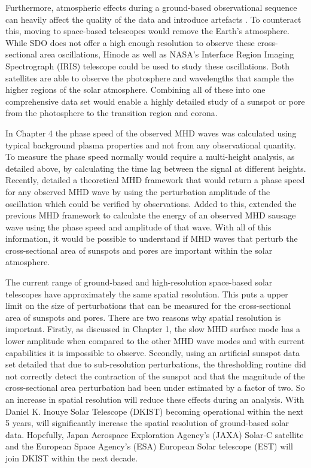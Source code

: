     Furthermore, atmospheric effects during a ground-based observational sequence can heavily affect the quality of the data and introduce artefacts \citep{2015A&A...579A..73M}.
    To counteract this, moving to space-based telescopes would remove the Earth's atmosphere.
    While SDO does not offer a high enough resolution to observe these cross-sectional area oscillations, Hinode as well as NASA's Interface Region Imaging Spectrograph (IRIS) telescope could be used to study these oscillations.
    Both satellites are able to observe the photosphere and wavelengths that sample the higher regions of the solar atmosphere. 
    Combining all of these into one comprehensive data set would enable a highly detailed study of a sunspot or pore from the photosphere to the transition region and corona.  
    
    In Chapter 4 the phase speed of the observed MHD waves was calculated using typical background plasma properties and not from any observational quantity.
    To measure the phase speed normally would require a multi-height analysis, as detailed above, by calculating the time lag between the signal at different heights.
    Recently, \cite{2015A&A...579A..73M} detailed a theoretical MHD framework that would return a phase speed for any observed MHD wave by using the perturbation amplitude of the oscillation which could be verified by observations. 
    Added to this, \cite{2015A&A...578A..60M} extended the previous MHD framework to calculate the energy of an observed MHD sausage wave using the phase speed and amplitude of that wave.
	With all of this information, it would be possible to understand if MHD waves that perturb the cross-sectional area of sunspots and pores are important within the solar atmosphere.
	
    The current range of ground-based and high-resolution space-based solar telescopes have approximately the same spatial resolution.
    This puts a upper limit on the size of perturbations that can be measured for the cross-sectional area of sunspots and pores.
    There are two reasons why spatial resolution is important.
    Firstly, as discussed in Chapter 1, the slow MHD surface mode has a lower amplitude when compared to the other MHD wave modes and with current capabilities it is impossible to observe.
    Secondly, \cite{2015A&A...579A..73M} using an artificial sunspot data set detailed that due to sub-resolution perturbations, the thresholding routine did not correctly detect the contraction of the sunspot and that the magnitude of the cross-sectional area perturbation had been under estimated by a factor of two.
    So an increase in spatial resolution will reduce these effects during an analysis.
	With Daniel K. Inouye Solar Telescope (DKIST) becoming operational within the next 5 years, will significantly increase the spatial resolution of ground-based solar data.
	Hopefully, Japan Aerospace Exploration Agency's (JAXA) Solar-C satellite and the European Space Agency's (ESA) European Solar telescope (EST) will join DKIST within the next decade.
	
